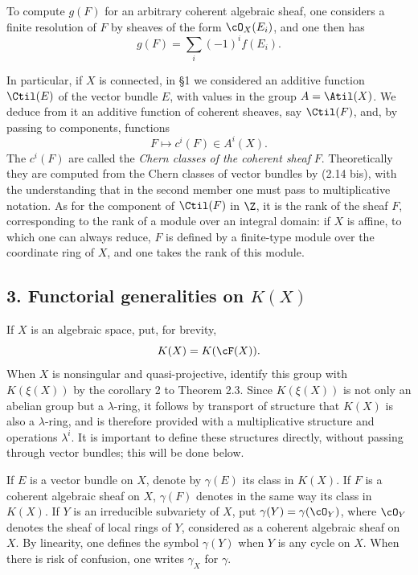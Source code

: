 To compute $g(F)$ for an arbitrary coherent algebraic sheaf, one considers a finite resolution of $F$ by sheaves of the form $\cO_X(E_i)$, and one then has
\begin{equation}\tag{2.14 bis}
 g(F)=\sum_i (-1)^i f(E_i).
\end{equation}

In particular, if $X$ is connected, in \S 1 we considered an additive function $\Ctil(E)$ of the vector bundle $E$, with values in the group $A=\Atil(X)$. We deduce from it an additive function of coherent sheaves, say $\Ctil(F)$, and, by passing to components, functions
\[
 F\longmapsto c^i(F)\in A^i(X).
\]
The $c^i(F)$ are called the \emph{Chern classes of the coherent sheaf} $F$. Theoretically they are computed from the Chern classes of vector bundles by (2.14 bis), with the understanding that in the second member one must pass to multiplicative notation. As for the component of $\Ctil(F)$ in $\Z$, it is the rank of the sheaf $F$, corresponding to the rank of a module over an integral domain: if $X$ is affine, to which one can always reduce, $F$ is defined by a finite-type module over the coordinate ring of $X$, and one takes the rank of this module.

\subsection*{3. Functorial generalities on $K(X)$}

If $X$ is an algebraic space, put, for brevity,
\[
 K(X)=K(\cF(X)).
\]
When $X$ is nonsingular and quasi-projective, identify this group with $K(\xi(X))$ by the corollary 2 to Theorem 2.3. Since $K(\xi(X))$ is not only an abelian group but a $\lambda$-ring, it follows by transport of structure that $K(X)$ is also a $\lambda$-ring, and is therefore provided with a multiplicative structure and operations $\lambda^i$. It is important to define these structures directly, without passing through vector bundles; this will be done below.

If $E$ is a vector bundle on $X$, denote by $\gamma(E)$ its class in $K(X)$. If $F$ is a coherent algebraic sheaf on $X$, $\gamma(F)$ denotes in the same way its class in $K(X)$. If $Y$ is an irreducible subvariety of $X$, put $\gamma(Y)=\gamma(\cO_Y)$, where $\cO_Y$ denotes the sheaf of local rings of $Y$, considered as a coherent algebraic sheaf on $X$. By linearity, one defines the symbol $\gamma(Y)$ when $Y$ is any cycle on $X$. When there is risk of confusion, one writes $\gamma_X$ for $\gamma$.

